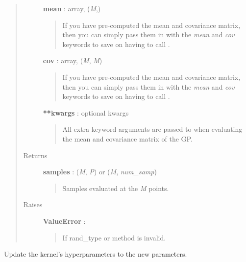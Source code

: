 \documentclass[letterpaper,10pt,english]{sphinxmanual}
\begin{document}
\begin{fulllineitems}
\begin{fulllineitems}
\begin{quote}
\begin{description}
\textbf{mean} : array, (\emph{M},)
\begin{quote}

If you have pre-computed the mean and covariance matrix, then you
can simply pass them in with the \emph{mean} and \emph{cov} keywords to save
on having to call {\hyperref[gptools:gptools.gaussian_process.GaussianProcess.predict]{}}.
\end{quote}

\textbf{cov} : array, (\emph{M}, \emph{M})
\begin{quote}

If you have pre-computed the mean and covariance matrix, then you
can simply pass them in with the \emph{mean} and \emph{cov} keywords to save
on having to call {\hyperref[gptools:gptools.gaussian_process.GaussianProcess.predict]{}}.
\end{quote}

\textbf{**kwargs} : optional kwargs
\begin{quote}

All extra keyword arguments are passed to {\hyperref[gptools:gptools.gaussian_process.GaussianProcess.predict]{}} when
evaluating the mean and covariance matrix of the GP.
\end{quote}

\item[{Returns}] \leavevmode
\textbf{samples} :  (\emph{M}, \emph{P}) or (\emph{M}, \emph{num\_samp})
\begin{quote}

Samples evaluated at the \emph{M} points.
\end{quote}

\item[{Raises}] \leavevmode
\textbf{ValueError} :
\begin{quote}

If rand\_type or method is invalid.
\end{quote}

\end{description}\end{quote}

\end{fulllineitems}


\begin{fulllineitems}
\label{gptools:gptools.gaussian_process.GaussianProcess.update_hyperparameters}
Update the kernel's hyperparameters to the new parameters.


\end{fulllineitems}
\end{fulllineitems}
\end{document}
